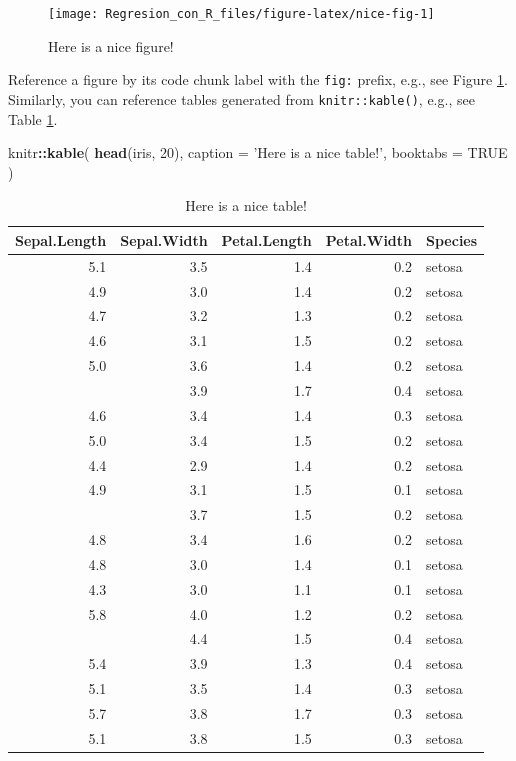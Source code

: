 \documentclass[]{book}
\makeatletter
\newenvironment{Shaded}{\begin{snugshade}}{\end{snugshade}}
\newcommand{\KeywordTok}[1]{\textcolor[rgb]{0.13,0.29,0.53}{\textbf{#1}}}
\newcommand{\DataTypeTok}[1]{\textcolor[rgb]{0.13,0.29,0.53}{#1}}
\newcommand{\DecValTok}[1]{\textcolor[rgb]{0.00,0.00,0.81}{#1}}
\newcommand{\StringTok}[1]{\textcolor[rgb]{0.31,0.60,0.02}{#1}}
\newcommand{\OtherTok}[1]{\textcolor[rgb]{0.56,0.35,0.01}{#1}}
\newcommand{\OperatorTok}[1]{\textcolor[rgb]{0.81,0.36,0.00}{\textbf{#1}}}
\newcommand{\NormalTok}[1]{#1}
\newenvironment{kframe}{%
  \medskip{}
  \setlength{\fboxsep}{.8em}
  \def\at@end@of@kframe{}%
  \ifinner\ifhmode%
  \def\at@end@of@kframe{\end{minipage}}%
  \begin{minipage}{\columnwidth}%
  \fi\fi%
  \def\FrameCommand##1{\hskip\@totalleftmargin \hskip-\fboxsep
  \colorbox{shadecolor}{##1}\hskip-\fboxsep
      \hskip-\linewidth \hskip-\@totalleftmargin \hskip\columnwidth}%
  \MakeFramed {\advance\hsize-\width
    \@totalleftmargin\z@ \linewidth\hsize
    \@setminipage}}%
{\par\unskip\endMakeFramed%
  \at@end@of@kframe}
\renewenvironment{Shaded}{\begin{kframe}}{\end{kframe}}
\makeatother
\begin{document}
\begin{figure}

{\centering \texttt{[image: Regresion\_con\_R\_files/figure-latex/nice-fig-1]} 

}

\caption{Here is a nice figure!}\label{fig:nice-fig}
\end{figure}

Reference a figure by its code chunk label with the \texttt{fig:}
prefix, e.g., see Figure \ref{fig:nice-fig}. Similarly, you can
reference tables generated from \texttt{knitr::kable()}, e.g., see Table
\ref{tab:nice-tab}.

\begin{Shaded}
\begin{Highlighting}[]
\NormalTok{knitr}\OperatorTok{::}\KeywordTok{kable}\NormalTok{(}
  \KeywordTok{head}\NormalTok{(iris, }\DecValTok{20}\NormalTok{), }\DataTypeTok{caption =} \StringTok{'Here is a nice table!'}\NormalTok{,}
  \DataTypeTok{booktabs =} \OtherTok{TRUE}
\NormalTok{)}
\end{Highlighting}
\end{Shaded}

\begin{table}[t]

\caption{\label{tab:nice-tab}Here is a nice table!}
\centering
\begin{tabular}{rrrrl}
\toprule
Sepal.Length & Sepal.Width & Petal.Length & Petal.Width & Species\\
\midrule
5.1 & 3.5 & 1.4 & 0.2 & setosa\\
4.9 & 3.0 & 1.4 & 0.2 & setosa\\
4.7 & 3.2 & 1.3 & 0.2 & setosa\\
4.6 & 3.1 & 1.5 & 0.2 & setosa\\
5.0 & 3.6 & 1.4 & 0.2 & setosa\\
\addlinespace
5.4 & 3.9 & 1.7 & 0.4 & setosa\\
4.6 & 3.4 & 1.4 & 0.3 & setosa\\
5.0 & 3.4 & 1.5 & 0.2 & setosa\\
4.4 & 2.9 & 1.4 & 0.2 & setosa\\
4.9 & 3.1 & 1.5 & 0.1 & setosa\\
\addlinespace
5.4 & 3.7 & 1.5 & 0.2 & setosa\\
4.8 & 3.4 & 1.6 & 0.2 & setosa\\
4.8 & 3.0 & 1.4 & 0.1 & setosa\\
4.3 & 3.0 & 1.1 & 0.1 & setosa\\
5.8 & 4.0 & 1.2 & 0.2 & setosa\\
\addlinespace
5.7 & 4.4 & 1.5 & 0.4 & setosa\\
5.4 & 3.9 & 1.3 & 0.4 & setosa\\
5.1 & 3.5 & 1.4 & 0.3 & setosa\\
5.7 & 3.8 & 1.7 & 0.3 & setosa\\
5.1 & 3.8 & 1.5 & 0.3 & setosa\\
\bottomrule
\end{tabular}
\end{table}
\end{document}
